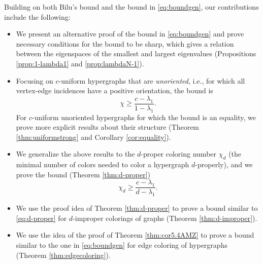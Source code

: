 \documentclass{article}
\theoremstyle{plain}
\theoremstyle{definition}
\theoremstyle{remark}
\begin{document}
Building on both Bilu's bound and the bound in \eqref{eq:boundgen}, our contributions include the following:
\begin{itemize}
    \item We present an alternative proof of the bound in \eqref{eq:boundgen} and prove necessary conditions for the bound to be sharp, which gives a relation between the eigenspaces of the smallest and largest eigenvalues (Propositions \ref{prop:1-lambda1} and \ref{prop:lambdaN-1}).
    \item Focusing on $c$-uniform hypergraphs that are \emph{unoriented}, i.e., for which all vertex-edge incidences have a positive orientation, the bound is \begin{equation}\label{eq:boundc-un}
        \chi \geq \frac{c-\lambda_1}{1-\lambda_1}.
    \end{equation}
    For $c$-uniform unoriented hypergraphs for which the bound is an equality, we prove more explicit results about their structure (Theorem \ref{thm:uniformstrong} and Corollary \ref{cor:equality}).
    \item We generalize the above results to the $d$-proper coloring number $\chi_d$ (the minimal number of colors needed to color a hypergraph $d$-properly), and we prove the bound (Theorem \ref{thm:d-proper})
    \begin{equation}\label{eq:d-proper}
        \chi_d \geq\frac{c-\lambda_1}{d-\lambda_1}.
    \end{equation}
    \item We use the proof idea of Theorem \ref{thm:d-proper} to prove a bound similar to \eqref{eq:d-proper} for $d$-improper colorings of graphs (Theorem \ref{thm:d-improper}).
    \item We use the idea of the proof of Theorem \ref{thm:cor5.4AMZ} to prove a bound similar to the one in \eqref{eq:boundgen} for edge coloring of hypergraphs (Theorem \ref{thm:edgecoloring}).
\end{itemize}


 












\end{document}
